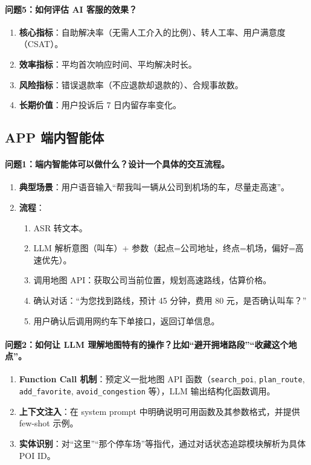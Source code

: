 \documentclass[12pt,a4paper]{article}
\begin{document}
\paragraph{问题5：如何评估 AI 客服的效果？}
\begin{enumerate}[label=(\arabic*)]
\item \textbf{核心指标}：自助解决率（无需人工介入的比例）、转人工率、用户满意度（CSAT）。
\item \textbf{效率指标}：平均首次响应时间、平均解决时长。
\item \textbf{风险指标}：错误退款率（不应退款却退款的）、合规事故数。
\item \textbf{长期价值}：用户投诉后 7 日内留存率变化。
\end{enumerate}

\subsection{APP 端内智能体}

\paragraph{问题1：端内智能体可以做什么？设计一个具体的交互流程。}
\begin{enumerate}[label=(\arabic*)]
\item \textbf{典型场景}：用户语音输入“帮我叫一辆从公司到机场的车，尽量走高速”。
\item \textbf{流程}：
\begin{enumerate}
  \item ASR 转文本。
  \item LLM 解析意图（叫车）+ 参数（起点=公司地址，终点=机场，偏好=高速优先）。
  \item 调用地图 API：获取公司当前位置，规划高速路线，估算价格。
  \item 确认对话：“为您找到路线，预计 45 分钟，费用 80 元，是否确认叫车？”
  \item 用户确认后调用网约车下单接口，返回订单信息。
\end{enumerate}
\end{enumerate}

\paragraph{问题2：如何让 LLM 理解地图特有的操作？比如“避开拥堵路段”“收藏这个地点”。}
\begin{enumerate}[label=(\arabic*)]
\item \textbf{Function Call 机制}：预定义一批地图 API 函数（\texttt{search\_poi}, \texttt{plan\_route}, \texttt{add\_favorite}, \texttt{avoid\_congestion} 等），LLM 输出结构化函数调用。
\item \textbf{上下文注入}：在 system prompt 中明确说明可用函数及其参数格式，并提供 few-shot 示例。
\item \textbf{实体识别}：对“这里”“那个停车场”等指代，通过对话状态追踪模块解析为具体 POI ID。
\end{enumerate}
\end{document}
